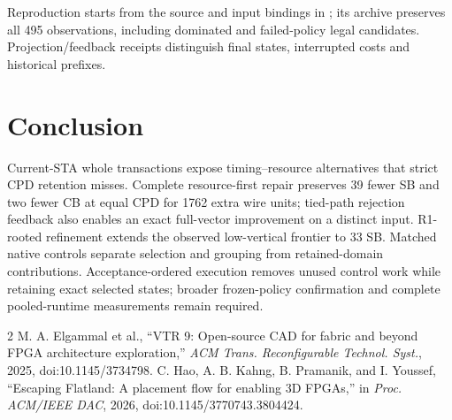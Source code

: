 \documentclass[conference,10pt]{IEEEtran}
\begin{document}
Reproduction starts from the source and input bindings in ; its archive preserves all 495 observations, including dominated and failed-policy legal candidates. Projection/feedback receipts distinguish final states, interrupted costs and historical prefixes.

\section{Conclusion}
Current-STA whole transactions expose timing--resource alternatives that strict CPD retention misses. Complete resource-first repair preserves 39 fewer SB and two fewer CB at equal CPD for 1762 extra wire units; tied-path rejection feedback also enables an exact full-vector improvement on a distinct input. R1-rooted refinement extends the observed low-vertical frontier to 33 SB. Matched native controls separate selection and grouping from retained-domain contributions. Acceptance-ordered execution removes unused control work while retaining exact selected states; broader frozen-policy confirmation and complete pooled-runtime measurements remain required.

\begin{thebibliography}{2}
 M. A. Elgammal et al., ``VTR 9: Open-source CAD for fabric and beyond FPGA architecture exploration,'' \emph{ACM Trans. Reconfigurable Technol. Syst.}, 2025, doi:10.1145/3734798.
 C. Hao, A. B. Kahng, B. Pramanik, and I. Youssef, ``Escaping Flatland: A placement flow for enabling 3D FPGAs,'' in \emph{Proc. ACM/IEEE DAC}, 2026, doi:10.1145/3770743.3804424.
\end{thebibliography}
\end{document}
